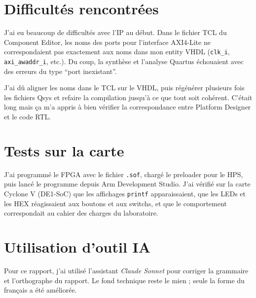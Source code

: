 \documentclass[a4paper,12pt]{article}
\begin{document}
\section{Difficultés rencontrées}

J'ai eu beaucoup de difficultés avec l'IP au début. Dans le fichier TCL du Component Editor, les noms des ports pour l'interface AXI4-Lite ne correspondaient pas exactement aux noms dans mon entity VHDL (\texttt{clk\_i}, \texttt{axi\_awaddr\_i}, etc.). Du coup, la synthèse et l'analyse Quartus échouaient avec des erreurs du type ``port inexistant''.

J'ai dû aligner les noms dans le TCL sur le VHDL, puis régénérer plusieurs fois les fichiers Qsys et refaire la compilation jusqu'à ce que tout soit cohérent. C'était long mais ça m'a appris à bien vérifier la correspondance entre Platform Designer et le code RTL.

\section{Tests sur la carte}

J'ai programmé le FPGA avec le fichier \texttt{.sof}, chargé le preloader pour le HPS, puis lancé le programme depuis Arm Development Studio. J'ai vérifié sur la carte Cyclone V (DE1-SoC) que les affichages \texttt{printf} apparaissaient, que les LEDs et les HEX réagissaient aux boutons et aux switchs, et que le comportement correspondait au cahier des charges du laboratoire.

\section{Utilisation d'outil IA}

Pour ce rapport, j'ai utilisé l'assistant \emph{Claude Sonnet} pour corriger la grammaire et l'orthographe du rapport. Le fond technique reste le mien ; seule la forme du français a été améliorée.
\end{document}
